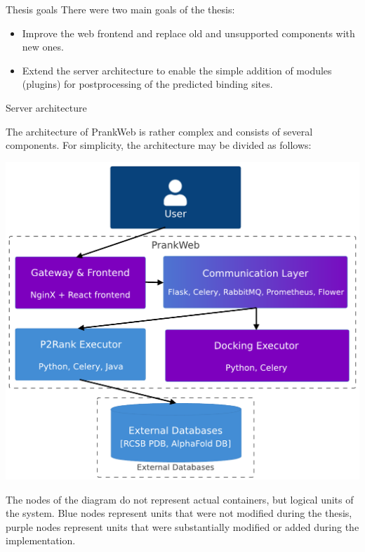\documentclass[portrait,a0paper,fontscale=0.25]{baposter}
\begin{document}
\begin{poster}
\begin{posterbox}[column=0, name=goals, below=intro, headerColorOne=cyan!60, boxColorOne=cyan!20]{Thesis goals}
There were two main goals of the thesis:
\begin{itemize}
\item Improve the web frontend and replace old and unsupported components with new ones.
\item Extend the server architecture to enable the simple addition of modules (plugins) for postprocessing of the predicted binding sites.
\end{itemize}
\end{posterbox}

\begin{posterbox}[column=0, name=architecture, below=goals]{Server architecture}

The architecture of PrankWeb is rather complex and consists of several components.
For simplicity, the architecture may be divided as follows:

\begin{center}
	\includegraphics[width=0.8\linewidth]{img/arch.pdf}
\end{center}

The nodes of the diagram do not represent actual containers, but logical units of the system. Blue nodes represent units that were not modified during the thesis, purple nodes represent units that were substantially modified or added during the implementation.



\end{posterbox}
\end{poster}
\end{document}
